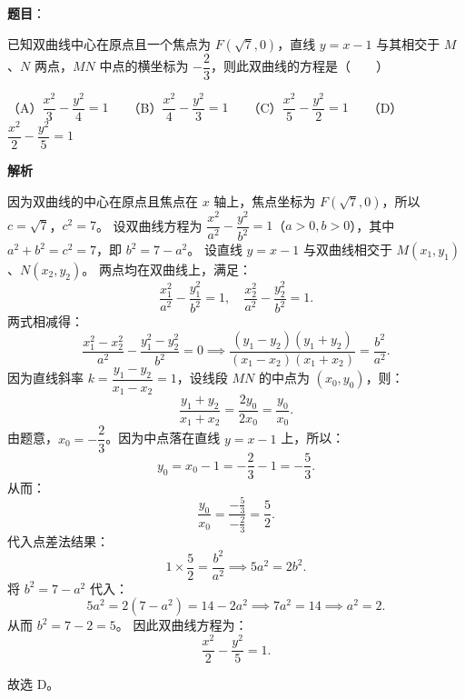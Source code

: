 \begin{answer}

\textbf{题目}：

已知双曲线中心在原点且一个焦点为 $F(\sqrt{7}, 0)$，直线 $y = x - 1$ 与其相交于 $M$、$N$ 两点，$MN$ 中点的横坐标为 $-\dfrac{2}{3}$，则此双曲线的方程是\mbox{（　　）}

（A）$\dfrac{x^2}{3} - \dfrac{y^2}{4} = 1$　　（B）$\dfrac{x^2}{4} - \dfrac{y^2}{3} = 1$　　（C）$\dfrac{x^2}{5} - \dfrac{y^2}{2} = 1$　　（D）$\dfrac{x^2}{2} - \dfrac{y^2}{5} = 1$

\textbf{解析}

因为双曲线的中心在原点且焦点在 $x$ 轴上，焦点坐标为 $F(\sqrt{7}, 0)$，所以 $c = \sqrt{7}$，$c^2 = 7$。
设双曲线方程为 $\dfrac{x^2}{a^2} - \dfrac{y^2}{b^2} = 1$（$a > 0, b > 0$），其中 $a^2 + b^2 = c^2 = 7$，即 $b^2 = 7 - a^2$。
设直线 $y = x - 1$ 与双曲线相交于 $M(x_1, y_1)$、$N(x_2, y_2)$。
两点均在双曲线上，满足：
\nopagebreak[4]
\[\frac{x_1^2}{a^2} - \frac{y_1^2}{b^2} = 1, \quad \frac{x_2^2}{a^2} - \frac{y_2^2}{b^2} = 1.\]
两式相减得：
\nopagebreak[4]
\[\frac{x_1^2 - x_2^2}{a^2} - \frac{y_1^2 - y_2^2}{b^2} = 0 \implies \frac{(y_1 - y_2)(y_1 + y_2)}{(x_1 - x_2)(x_1 + x_2)} = \frac{b^2}{a^2}.\]
因为直线斜率 $k = \dfrac{y_1 - y_2}{x_1 - x_2} = 1$，设线段 $MN$ 的中点为 $(x_0, y_0)$，则：
\nopagebreak[4]
\[\frac{y_1 + y_2}{x_1 + x_2} = \frac{2y_0}{2x_0} = \frac{y_0}{x_0}.\]
由题意，$x_0 = -\dfrac{2}{3}$。因为中点落在直线 $y = x - 1$ 上，所以：
\nopagebreak[4]
\[y_0 = x_0 - 1 = -\frac{2}{3} - 1 = -\frac{5}{3}.\]
从而：
\nopagebreak[4]
\[\frac{y_0}{x_0} = \frac{-\frac{5}{3}}{-\frac{2}{3}} = \frac{5}{2}.\]
代入点差法结果：
\nopagebreak[4]
\[1 \times \frac{5}{2} = \frac{b^2}{a^2} \implies 5a^2 = 2b^2.\]
将 $b^2 = 7 - a^2$ 代入：
\nopagebreak[4]
\[5a^2 = 2(7 - a^2) = 14 - 2a^2 \implies 7a^2 = 14 \implies a^2 = 2.\]
从而 $b^2 = 7 - 2 = 5$。
因此双曲线方程为：
\nopagebreak[4]
\[\frac{x^2}{2} - \frac{y^2}{5} = 1.\]

故选 D。


\end{answer}
